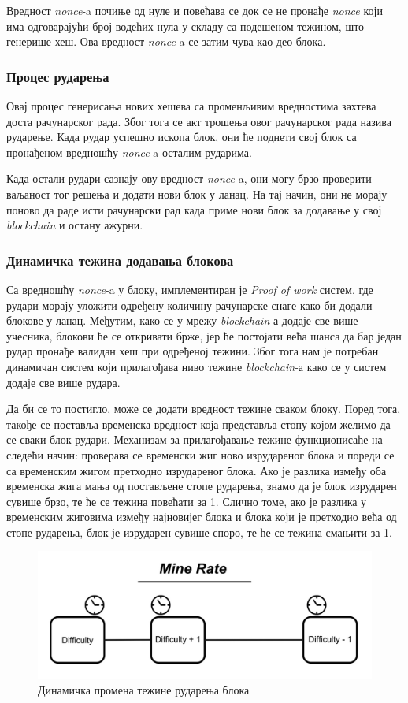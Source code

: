 \documentclass[12pt, a4paper]{article}
\begin{document}
Вредност \textit{nonce}-a почиње од нуле и повећава се док се не пронађе \textit{nonce} који има одговарајући број водећих нула у складу са подешеном тежином, што генерише хеш. Ова вредност \textit{nonce}-a се затим чува као део блока.

\subsubsection{Процес рударења}
Овај процес генерисања нових хешева са променљивим вредностима захтева доста рачунарског рада. Због тога се акт трошења овог рачунарског рада назива рударење. Када рудар успешно ископа блок, они ће поднети свој блок са пронађеном вредношћу \textit{nonce}-a осталим рударима.

Када остали рудари сазнају ову вредност \textit{nonce}-a, они могу брзо проверити ваљаност тог решења и додати нови блок у ланац. На тај начин, они не морају поново да раде исти рачунарски рад када приме нови блок за додавање у свој \textit{blockchain} и остану ажурни.

\subsubsection{Динамичка тежина додавања блокова}
Са вредношћу \textit{nonce}-a у блоку, имплементиран је \textit{Proof of work} систем, где рудари морају уложити одређену количину рачунарске снаге како би додали блокове у ланац. Међутим, како се у мрежу \textit{blockchain}-а додаје све више учесника, блокови ће се откривати брже, јер ће постојати већа шанса да бар један рудар пронађе валидан хеш при одређеној тежини. Због тога нам је потребан динамичан систем који прилагођава ниво тежине \textit{blockchain}-а како се у систем додаје све више рудара.

Да би се то постигло, може се додати вредност тежине сваком блоку. Поред тога, такође се поставља временска вредност која представља стопу којом желимо да се сваки блок рудари. Механизам за прилагођавање тежине функционисаће на следећи начин: проверава се временски жиг ново изрудареног блока и пореди се са временским жигом претходно изрудареног блока. Ако је разлика између оба временска жига мања од постављене стопе рударења, знамо да је блок изрударен сувише брзо, те ће се тежина повећати за 1. Слично томе, ако је разлика у временским жиговима између најновијег блока и блока који је претходио већа од стопе рударења, блок је изрударен сувише споро, те ће се тежина смањити за 1. 


\begin{figure}[h]
    \centering
    \includegraphics[width=0.7\linewidth]{slike/dynamic-block-difficulty.png}
    \caption{Динамичка промена тежине рударења блока}
    \label{fig:dynamic-mine-rate}
\end{figure}
\end{document}
